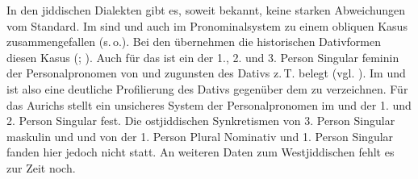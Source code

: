 
In den jiddischen Dialekten gibt es, soweit bekannt, keine starken Abweichungen vom Standard. Im  sind  und  auch im Pronominalsystem zu einem obliquen Kasus zusammengefallen (s.\,o.). Bei den  übernehmen die historischen Dativformen diesen Kasus (\cite[184]{Jacobs2005}; \cite[139–149]{Wolf1969}). Auch für das  ist ein  der 1., 2. und 3. Person  Singular feminin der Personalpronomen von  und  zugunsten des Dativs z.\,T. belegt (vgl. \cite[139–149]{Wolf1969}). Im  und  ist also eine deutliche Profilierung des Dativs gegenüber dem  zu verzeichnen. Für das  Aurichs stellt \textcite[63]{Reershemius2007} ein unsicheres System der Personalpronomen im  und  der 1. und 2. Person Singular fest. Die ostjiddischen Synkretismen von 3. Person Singular maskulin  und  und von der 1. Person Plural Nominativ und 1. Person Singular  fanden hier jedoch nicht statt.  An weiteren Daten zum Westjiddischen fehlt es zur Zeit noch. 


